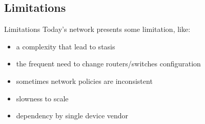 \subsection{Limitations}
\begin{frame}{Limitations}
Today's network presents some limitation, like:
\begin{itemize}
\item<2-> a complexity that lead to stasis
\item<3-> the frequent need to change routers/switches configuration
\item<4-> sometimes network policies are inconsistent
\item<5-> slowness to scale
\item<6-> dependency by single device vendor
\end{itemize}
\end{frame}